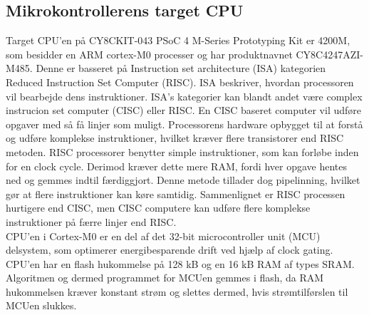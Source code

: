 \subsection{Mikrokontrollerens target CPU}
Target CPU'en på CY8CKIT-043 PSoC 4 M-Series Prototyping Kit er 4200M, som besidder en ARM cortex-M0 processer og har produktnavnet CY8C4247AZI-M485. Denne er basseret på Instruction set architecture (ISA) kategorien Reduced Instruction Set Computer (RISC). ISA beskriver, hvordan processoren vil bearbejde dens instruktioner. ISA's kategorier kan blandt andet være complex instrucion set computer (CISC) eller RISC. En CISC baseret computer vil udføre opgaver med så få linjer som muligt. Processorens hardware opbygget til at forstå og udføre komplekse instruktioner, hvilket kræver flere transistorer end RISC metoden. RISC processorer benytter simple instruktioner, som kan forløbe inden for en clock cycle. Derimod kræver dette mere RAM, fordi hver opgave hentes ned og gemmes indtil færdiggjort. Denne metode tillader dog pipelinning, hvilket gør at flere instruktioner kan køre samtidig. Sammenlignet er RISC processen hurtigere end CISC, men CISC computere kan udføre flere komplekse instruktioner på færre linjer end RISC. \citep{CYPRESS2016Cortexm0,Semiconductor20164200M,Yadav2016}\\
CPU'en i Cortex-M0 er en del af det 32-bit microcontroller unit (MCU) delsystem, som optimerer energibesparende drift ved hjælp af clock gating. %
CPU'en har en flash hukommelse på 128 kB og en 16 kB RAM af types SRAM. Algoritmen og dermed programmet for MCUen gemmes i flash, da RAM hukommelsen kræver konstant strøm og slettes dermed, hvis strømtilførslen til MCUen slukkes. \citep{Semiconductor20164200M}
%
